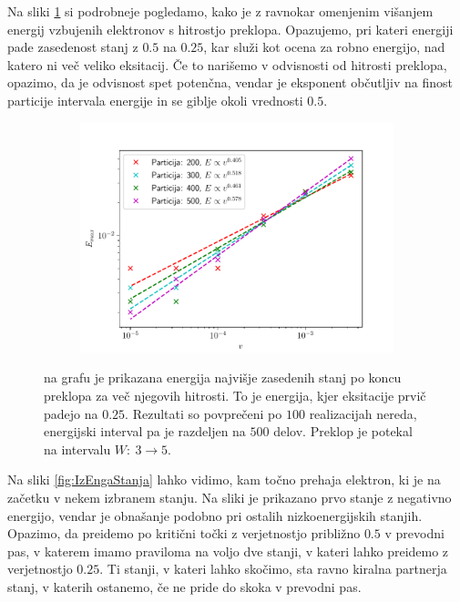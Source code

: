 Na sliki \ref{fig:Emax} si podrobneje pogledamo, kako je z ravnokar omenjenim višanjem energij vzbujenih elektronov s hitrostjo preklopa. Opazujemo, pri kateri energiji pade zasedenost stanj z $0.5$ na $0.25$, kar služi kot ocena za robno energijo, nad katero ni več veliko eksitacij. Če to narišemo v odvisnosti od hitrosti preklopa, opazimo, da je odvisnost spet potenčna, vendar je eksponent občutljiv na finost particije intervala energije in se giblje okoli vrednosti $0.5$.
\begin{figure}[H]
\centering
\begin{subfigure}{\textwidth}
\includegraphics[width=\linewidth]{Figures/Emax.pdf}
\end{subfigure}
\caption{na grafu je prikazana energija najvišje zasedenih stanj po koncu preklopa za več njegovih hitrosti. To je energija, kjer eksitacije prvič padejo na $0.25$. Rezultati so povprečeni po $100$ realizacijah nereda, energijski interval pa je razdeljen na $500$ delov. Preklop je potekal na intervalu $W:\ 3 \to 5$.}
\label{fig:Emax}
\end{figure}
Na sliki \ref{fig:IzEngaStanja} lahko vidimo, kam točno prehaja elektron, ki je na začetku v nekem izbranem stanju. Na sliki je prikazano prvo stanje z negativno energijo, vendar je obnašanje podobno pri ostalih nizkoenergijskih stanjih. Opazimo, da preidemo po kritični točki z verjetnostjo približno $0.5$ v prevodni pas, v katerem imamo praviloma na voljo dve stanji, v kateri lahko preidemo z verjetnostjo $0.25$. Ti stanji, v kateri lahko skočimo, sta ravno kiralna partnerja stanj, v katerih ostanemo, če ne pride do skoka v prevodni pas.  
